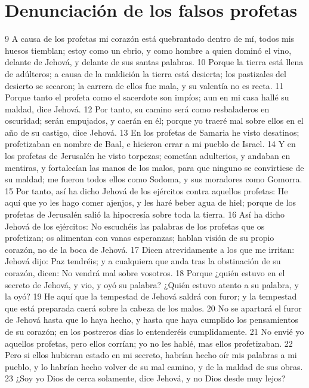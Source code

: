 \section*{Denunciación de los falsos profetas}

9 A causa de los profetas mi corazón está quebrantado dentro de mí, todos mis huesos tiemblan; estoy como un ebrio, y como hombre a quien dominó el vino, delante de Jehová, y delante de sus santas palabras.
10 Porque la tierra está llena de adúlteros; a causa de la maldición la tierra está desierta; los pastizales del desierto se secaron; la carrera de ellos fue mala, y su valentía no es recta.
11 Porque tanto el profeta como el sacerdote son impíos; aun en mi casa hallé su maldad, dice Jehová.
12 Por tanto, su camino será como resbaladeros en oscuridad; serán empujados, y caerán en él; porque yo traeré mal sobre ellos en el año de su castigo, dice Jehová.
13 En los profetas de Samaria he visto desatinos; profetizaban en nombre de Baal, e hicieron errar a mi pueblo de Israel.
14 Y en los profetas de Jerusalén he visto torpezas; cometían adulterios, y andaban en mentiras, y fortalecían las manos de los malos, para que ninguno se convirtiese de su maldad; me fueron todos ellos como Sodoma, y sus moradores como Gomorra.
15 Por tanto, así ha dicho Jehová de los ejércitos contra aquellos profetas: He aquí que yo les hago comer ajenjos, y les haré beber agua de hiel; porque de los profetas de Jerusalén salió la hipocresía sobre toda la tierra.
16 Así ha dicho Jehová de los ejércitos: No escuchéis las palabras de los profetas que os profetizan; os alimentan con vanas esperanzas; hablan visión de su propio corazón, no de la boca de Jehová.
17 Dicen atrevidamente a los que me irritan: Jehová dijo: Paz tendréis; y a cualquiera que anda tras la obstinación de su corazón, dicen: No vendrá mal sobre vosotros.
18 Porque ¿quién estuvo en el secreto de Jehová, y vio, y oyó su palabra? ¿Quién estuvo atento a su palabra, y la oyó?
19 He aquí que la tempestad de Jehová saldrá con furor; y la tempestad que está preparada caerá sobre la cabeza de los malos.
20 No se apartará el furor de Jehová hasta que lo haya hecho, y hasta que haya cumplido los pensamientos de su corazón; en los postreros días lo entenderéis cumplidamente.
21 No envié yo aquellos profetas, pero ellos corrían; yo no les hablé, mas ellos profetizaban.
22 Pero si ellos hubieran estado en mi secreto, habrían hecho oír mis palabras a mi pueblo, y lo habrían hecho volver de su mal camino, y de la maldad de sus obras.
23 ¿Soy yo Dios de cerca solamente, dice Jehová, y no Dios desde muy lejos?
